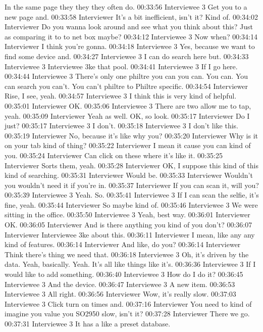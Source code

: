 In the same page they they they often do.
00:33:56 Interviewee 3
Get you to a new page and.
00:33:58 Interviewer
It's a bit inefficient, isn't it? Kind of.
00:34:02 Interviewer
Do you wanna look around and see what you think about this? Just as comparing it to to net box maybe?
00:34:12 Interviewee 3
Now when?
00:34:14 Interviewer
I think you're gonna.
00:34:18 Interviewee 3
Yes, because we want to find some device and.
00:34:27 Interviewee 3
I can do search here but.
00:34:33 Interviewee 3
Interviewee 3ke that pool.
00:34:41 Interviewee 3
If I go here.
00:34:44 Interviewee 3
There's only one philtre you can you can. You can. You can search you can't. You can't philtre to Philtre specific.
00:34:54 Interviewer
Rise, I see, yeah.
00:34:57 Interviewee 3
I think this is very kind of helpful.
00:35:01 Interviewer
OK.
00:35:06 Interviewee 3
There are two allow me to tap, yeah.
00:35:09 Interviewer
Yeah as well. OK, so look.
00:35:17 Interviewer
Do I just?
00:35:17 Interviewee 3
I don't.
00:35:18 Interviewee 3
I don't like this.
00:35:19 Interviewer
No, because it's like why you?
00:35:20 Interviewer
Why is it on your tab kind of thing?
00:35:22 Interviewer
I mean it cause you can kind of you.
00:35:24 Interviewer
Can click on these where it's like it.
00:35:25 Interviewer
Sorts them, yeah.
00:35:28 Interviewer
OK, I suppose this kind of this kind of searching.
00:35:31 Interviewer
Would be.
00:35:33 Interviewer
Wouldn't you wouldn't need it if you're in.
00:35:37 Interviewer
If you can scan it, will you?
00:35:39 Interviewee 3
Yeah. So.
00:35:41 Interviewee 3
If I can scan the selfie, it's fine, yeah.
00:35:44 Interviewer
So maybe kind of.
00:35:46 Interviewee 3
We were sitting in the office.
00:35:50 Interviewee 3
Yeah, best way.
00:36:01 Interviewer
OK.
00:36:05 Interviewer
And is there anything you kind of you don't?
00:36:07 Interviewer
Interviewee 3ke about this.
00:36:11 Interviewer
I mean, like any any kind of features.
00:36:14 Interviewer
And like, do you?
00:36:14 Interviewer
Think there's thing we need that.
00:36:18 Interviewee 3
Oh, it's driven by the data. Yeah, basically. Yeah. It's all like things like it's.
00:36:36 Interviewee 3
If I would like to add something.
00:36:40 Interviewee 3
How do I do it?
00:36:45 Interviewee 3
And the device.
00:36:47 Interviewee 3
A new item.
00:36:53 Interviewee 3
All right.
00:36:56 Interviewer
Wow, it's really slow.
00:37:03 Interviewee 3
Click turn on times and.
00:37:16 Interviewer
You need to kind of imagine you value you SO2950 slow, isn't it?
00:37:28 Interviewer
There we go.
00:37:31 Interviewee 3
It has a like a preset database.
